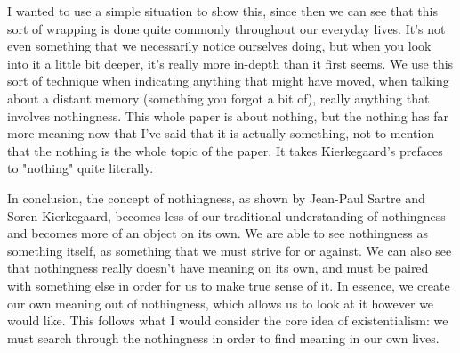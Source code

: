 \documentclass[12pt]{article}
\begin{document}
  I wanted to use a simple situation to show this, since then we can see that this sort of wrapping is done quite
  commonly throughout our everyday lives. It's not even something that we necessarily notice ourselves doing, but when
  you look into it a little bit deeper, it's really more in-depth than it first seems. We use this sort of technique
  when indicating anything that might have moved, when talking about a distant memory (something you forgot a bit of),
  really anything that involves nothingness. This whole paper is about nothing, but the nothing has far more meaning
  now that I've said that it is actually something, not to mention that the nothing is the whole topic of the paper.
  It takes Kierkegaard's prefaces to "nothing" quite literally.

  In conclusion, the concept of nothingness, as shown by Jean-Paul Sartre and Soren Kierkegaard, becomes less of our
  traditional understanding of nothingness and becomes more of an object on its own. We are able to see nothingness
  as something itself, as something that we must strive for or against. We can also see that nothingness really doesn't
  have meaning on its own, and must be paired with something else in order for us to make true sense of it. In essence,
  we create our own meaning out of nothingness, which allows us to look at it however we would like. This follows what
  I would consider the core idea of existentialism: we must search through the nothingness in order to find meaning in
  our own lives.
\end{document}
